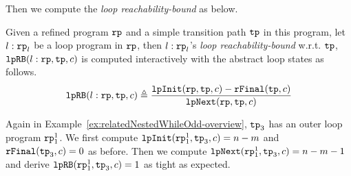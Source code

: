 %
Then we compute the
\emph{loop reachability-bound} as below.
\begin{defn}
  \label{def:looprb}
  Given a refined program $\mathtt{rp}$ and a simple transition path $\mathtt{tp}$ in this program, 
  let $l: \mathtt{rp}_l$ be a loop program in $\mathtt{rp}$,
  then $l: \mathtt{rp}_l$'s \emph{loop reachability-bound} w.r.t. $\mathtt{tp}$, $\mathtt{lpRB}(l: \mathtt{rp}, \mathtt{tp}, c)$
  is computed interactively with the abstract loop states as follows. 
  \[
    \mathtt{lpRB}(l: \mathtt{rp}, \mathtt{tp}, c) \triangleq
    \frac{\mathtt{lpInit}(\mathtt{rp}, \mathtt{tp}, c) - \mathtt{rFinal}(\mathtt{tp}, c)}{\mathtt{lpNext}(\mathtt{rp}, \mathtt{tp}, c)}
  \]
\end{defn}
%
Again in Example~\ref{ex:relatedNestedWhileOdd-overview}, $\mathtt{tp}_3$ has an outer loop program $\mathtt{rp}_1^1$.
We first compute $\mathtt{lpInit}(\mathtt{rp}_1^1, \mathtt{tp}_3, c) = n - m $ and $\mathtt{rFinal}(\mathtt{tp}_3, c) = 0$ as before.
Then we compute $\mathtt{lpNext}(\mathtt{rp}_1^1, \mathtt{tp}_3, c) = n - m - 1$ and derive $\mathtt{lpRB}(\mathtt{rp}_1^1, \mathtt{tp}_3, c) = 1$ as tight as expected.

